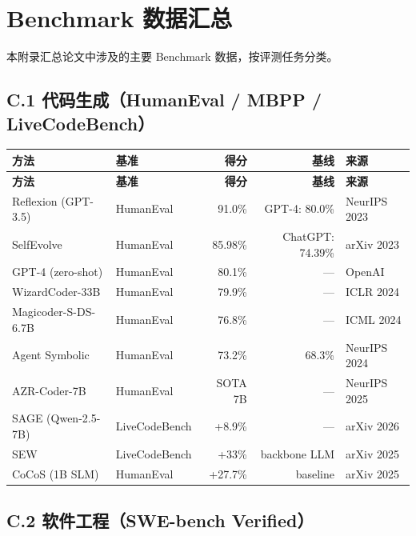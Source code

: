 \section{Benchmark 数据汇总}\label{app:benchmarks}

本附录汇总论文中涉及的主要 Benchmark 数据，按评测任务分类。

\subsection*{C.1 代码生成（HumanEval / MBPP / LiveCodeBench）}

\begin{longtable}{p{3.5cm}p{2.5cm}rrp{3cm}}
\toprule
\textbf{方法} & \textbf{基准} & \textbf{得分} & \textbf{基线} & \textbf{来源} \\
\midrule
\endfirsthead
\toprule
\textbf{方法} & \textbf{基准} & \textbf{得分} & \textbf{基线} & \textbf{来源} \\
\midrule
\endhead
\bottomrule
\endlastfoot

Reflexion (GPT-3.5) & HumanEval & 91.0\% & GPT-4: 80.0\% & NeurIPS 2023 \\
SelfEvolve & HumanEval & 85.98\% & ChatGPT: 74.39\% & arXiv 2023 \\
GPT-4 (zero-shot) & HumanEval & 80.1\% & — & OpenAI \\
WizardCoder-33B & HumanEval & 79.9\% & — & ICLR 2024 \\
Magicoder-S-DS-6.7B & HumanEval & 76.8\% & — & ICML 2024 \\
Agent Symbolic & HumanEval & 73.2\% & 68.3\% & NeurIPS 2024 \\
AZR-Coder-7B & HumanEval & SOTA 7B & — & NeurIPS 2025 \\
SAGE (Qwen-2.5-7B) & LiveCodeBench & +8.9\% & — & arXiv 2026 \\
SEW & LiveCodeBench & +33\% & backbone LLM & arXiv 2025 \\
CoCoS (1B SLM) & HumanEval & +27.7\% & baseline & arXiv 2025 \\
\end{longtable}

\subsection*{C.2 软件工程（SWE-bench Verified）}

